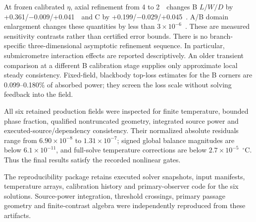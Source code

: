 At frozen calibrated $\eta$, axial refinement from 4 to 2~\um\ changes B $L/W/D$ by +0.361/$-0.009$/+0.041~\um\ and C by +0.199/$-0.029$/+0.045~\um. A/B domain enlargement changes these quantities by less than $3\times10^{-6}$~\um. These are measured sensitivity contrasts rather than certified error bounds. There is no branch-specific three-dimensional asymptotic refinement sequence. In particular, submicrometre interaction effects are reported descriptively. An older transient comparison at a different B calibration stage supplies only approximate local steady consistency. Fixed-field, blackbody top-loss estimates for the B corners are 0.099--0.180\% of absorbed power; they screen the loss scale without solving feedback into the field.

All six retained production fields were inspected for finite temperature, bounded phase fraction, qualified nontruncated geometry, integrated source power and executed-source/dependency consistency. Their normalized absolute residuals range from $6.90\times10^{-8}$ to $1.31\times10^{-7}$; signed global balance magnitudes are below $6.1\times10^{-11}$, and full-solve temperature corrections are below $2.7\times10^{-5}$~$^\circ$C. Thus the final results satisfy the recorded nonlinear gates.

The reproducibility package retains executed solver snapshots, input manifests, temperature arrays, calibration history and primary-observer code for the six solutions. Source-power integration, threshold crossings, primary passage geometry and finite-contrast algebra were independently reproduced from these artifacts.

